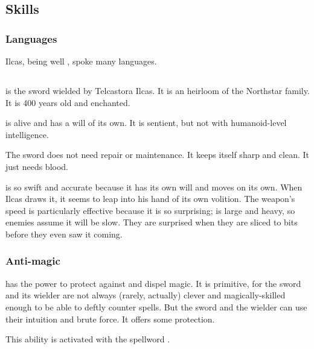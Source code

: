 \subsection{Skills}





\subsubsection{Languages}
Ilcas, being well \travelled, spoke many languages.









\subsection{\Telderain}
\index{\Telderain}
\Telderain{} is the sword wielded by Telcastora Ilcas. 
It is an heirloom of the Northstar family. 
It is 400 years old and enchanted. 

\Telderain{} is alive and has a will of its own. 
It is sentient, but not with humanoid-level intelligence. 

The sword does not need repair or maintenance. 
It keeps itself sharp and clean. 
It just needs blood. 

\Telderain{} is so swift and accurate because it has its own will and moves on its own. 
When Ilcas draws it, it seems to leap into his hand of its own volition. 
The weapon's speed is particularly effective because it is so surprising; \Telderain{} is large and heavy, so enemies assume it will be slow. 
They are surprised when they are sliced to bits before they even saw it coming.





\subsubsection{Anti-magic}
\Telderain{} has the power to protect against and dispel magic. 
It is primitive, for the sword and its wielder are not always (rarely, actually) clever and magically-skilled enough to be able to deftly counter spells. 
But the sword and the wielder can use their intuition and brute force. 
It offers some protection. 

This ability is activated with the spellword . 





